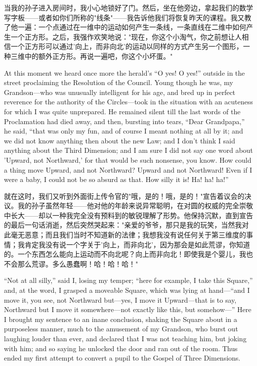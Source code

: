 \documentclass[12pt,UTF8]{ctexbook}
\begin{document}
当我的孙子进入房间时，我小心地锁好了门。然后，坐在他旁边，拿起我们的数学写字板——或者如你们所称的"线条"——我告诉他我们将恢复昨天的课程。我又教了他一遍：一个点通过在一维中的运动如何产生一条线，一条直线在二维中如何产生一个正方形。之后，我强作欢笑地说："现在，你这个小淘气，你之前想让人相信一个正方形可以通过'向上，而非向北'的运动以同样的方式产生另一个图形，一种三维中的额外正方形。再说一遍吧，你这个小坏蛋。"

At this moment we heard once more the herald's ``O yes! O yes!'' outside in the street proclaiming the Resolution of the Council. Young though he was, my Grandson---who was unusually intelligent for his age, and bred up in perfect reverence for the authority of the Circles---took in the situation with an acuteness for which I was quite unprepared. He remained silent till the last words of the Proclamation had died away, and then, bursting into tears, ``Dear Grandpapa,'' he said, ``that was only my fun, and of course I meant nothing at all by it; and we did not know anything then about the new Law; and I don't think I said anything about the Third Dimension; and I am sure I did not say one word about 'Upward, not Northward,' for that would be such nonsense, you know. How could a thing move Upward, and not Northward? Upward and not Northward! Even if I were a baby, I could not be so absurd as that. How silly it is! Ha! ha! ha!''

就在这时，我们又听到外面街上传令官的"哦，是的！哦，是的！"宣告着议会的决议。我的孙子虽然年轻——他对他的年龄来说异常聪明，在对圆的权威的完全崇敬中长大——却以一种我完全没有预料到的敏锐理解了形势。他保持沉默，直到宣告的最后一句话消逝，然后突然哭起来："亲爱的爷爷，那只是我的玩笑，当然我对此毫无恶意；而且我们当时不知道新的法律；我想我没有说任何关于第三维度的事情；我肯定我没有说一个字关于'向上，而非向北'，因为那会是如此荒谬，你知道的。一个东西怎么能向上运动而不向北呢？向上而非向北！即使我是个婴儿，我也不会那么荒谬。多么愚蠢啊！哈！哈！哈！"

``Not at all silly,'' said I, losing my temper; ``here for example, I take this Square,'' and, at the word, I grasped a moveable Square, which was lying at hand---``and I move it, you see, not Northward but---yes, I move it Upward---that is to say, Northward but I move it somewhere---not exactly like this, but somehow---'' Here I brought my sentence to an inane conclusion, shaking the Square about in a purposeless manner, much to the amusement of my Grandson, who burst out laughing louder than ever, and declared that I was not teaching him, but joking with him; and so saying he unlocked the door and ran out of the room. Thus ended my first attempt to convert a pupil to the Gospel of Three Dimensions.
\end{document}
